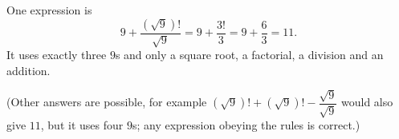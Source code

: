 One expression is
\[\boxed{9+\dfrac{\left(\sqrt9\right)!}{\sqrt9}}=9+\dfrac{3!}{3}=9+\dfrac{6}{3}=11.\]
It uses exactly three $9$s and only a square root, a factorial, a division and an addition.

(Other answers are possible, for example $\left(\sqrt9\right)!+\left(\sqrt9\right)!-\dfrac{\sqrt9}{\sqrt9}$ would also give $11$, but it uses four $9$s; any expression obeying the rules is correct.)
